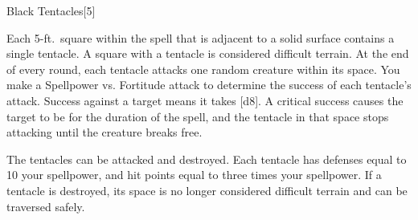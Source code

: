 \begin{spellsection}{Black Tentacles}[5]
    \begin{spellheader}
    \end{spellheader}
    \begin{spellcontent}
        \begin{spelltargetinginfo}
        \end{spelltargetinginfo}
        \begin{spelleffects}
            \spelleffect Each 5-ft.\ square within the spell that is adjacent to a solid surface contains a single tentacle.
            A square with a tentacle is considered difficult terrain.
            At the end of every round, each tentacle attacks one random creature within its space.
            You make a Spellpower vs. Fortitude attack to determine the success of each tentacle's attack.
            Success against a target means it takes [d8].
            A critical success causes the target to be \immobilized for the duration of the spell, and the tentacle in that space stops attacking until the creature breaks free.

            The tentacles can be attacked and destroyed.
            Each tentacle has defenses equal to 10 \add your spellpower, and hit points equal to three times your spellpower.
            If a tentacle is destroyed, its space is no longer considered difficult terrain and can be traversed safely.
            \spelldur \durshort
        \end{spelleffects}
    \end{spellcontent}
    \begin{spellfooter}
        \miscastyou
    \end{spellfooter}
    \begin{spellaugments}
    \end{spellaugments}
\end{spellsection}

